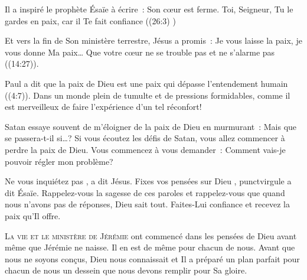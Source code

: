 Il a inspiré le prophète Ésaïe à écrire~: 
 \og Son cœur est ferme. Toi, Seigneur, Tu le gardes en paix,
 car il Te fait confiance \fg{}
 ((26:3) \BFC) 


Et vers la fin de Son ministère terrestre, Jésus a promis~:
 \og Je vous laisse la paix, je vous donne Ma paix\dots{}
 Que votre cœur ne se trouble pas et ne s'alarme pas \fg{}
 ((14:27)). 

Paul a dit que la paix de Dieu est une paix qui dépasse l'entendement humain
 ((4:7)).
 Dans un monde plein de tumulte et de pressions formidables,
 comme il est merveilleux de faire l'expérience d'un tel réconfort! 

Satan essaye souvent de m'éloigner de la paix de Dieu en murmurant~:
 \og Mais que se passera-t-il si\dots{}? \fg{} 
 Si vous écoutez les défis de Satan, vous allez commencer
 à perdre la paix de Dieu. Vous commencez à vous demander~:
 \og Comment vais-je pouvoir régler mon problème? \fg{} 

\og Ne vous inquiétez pas \fg{}, 
 a dit Jésus.
 \og Fixes vos 
 pensées sur Dieu \fg{}, punct{virgule}
 a dit Ésaïe.
 Rappelez-vous la sagesse de ces paroles et rappelez-vous que
 quand nous n'avons pas de réponses, Dieu sait tout.
 Faites-Lui confiance et recevez la paix qu'Il offre.

\dvrule







\lettrine{L}{a vie et le ministère de Jérémie} ont commencé
 dans les pensées de Dieu avant même que Jérémie ne naisse.
 Il en est de même pour chacun de nous. Avant que nous ne soyons conçus,
 Dieu nous connaissait et Il a préparé un plan parfait pour chacun de nous
 \ocadr un dessein que nous devons remplir pour Sa gloire. 

